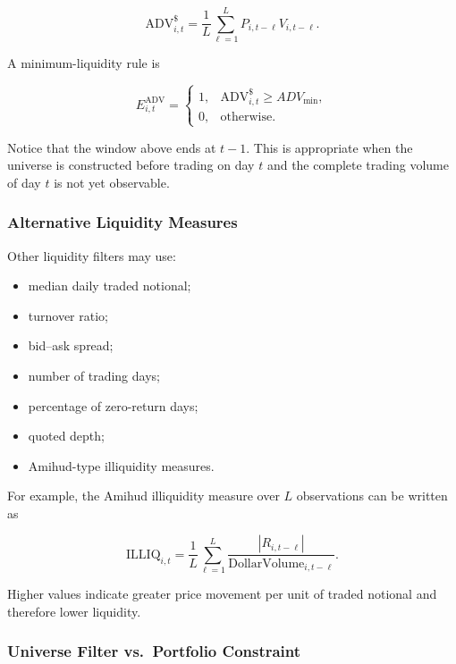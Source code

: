 \documentclass[11pt,a4paper]{article}
\begin{document}
\begin{equation}
\mathrm{ADV}_{i,t}^{\$}
=
\frac{1}{L}
\sum_{\ell=1}^{L}
P_{i,t-\ell}
V_{i,t-\ell}.
\end{equation}

A minimum-liquidity rule is

\begin{equation}
E_{i,t}^{\mathrm{ADV}}
=
\begin{cases}
1,
&
\mathrm{ADV}_{i,t}^{\$}
\geq
ADV_{\min},
\\
0,
&
\text{otherwise}.
\end{cases}
\end{equation}

Notice that the window above ends at $t-1$. This is appropriate when the
universe is constructed before trading on day $t$ and the complete trading
volume of day $t$ is not yet observable.


\subsubsection{Alternative Liquidity Measures}

Other liquidity filters may use:

\begin{itemize}
    \item median daily traded notional;
    \item turnover ratio;
    \item bid--ask spread;
    \item number of trading days;
    \item percentage of zero-return days;
    \item quoted depth;
    \item Amihud-type illiquidity measures.
\end{itemize}

For example, the Amihud illiquidity measure over $L$ observations can be written
as

\begin{equation}
\boxed{
\mathrm{ILLIQ}_{i,t}
=
\frac{1}{L}
\sum_{\ell=1}^{L}
\frac{
|R_{i,t-\ell}|
}{
\mathrm{DollarVolume}_{i,t-\ell}
}.
}
\end{equation}

Higher values indicate greater price movement per unit of traded notional and
therefore lower liquidity.


\subsubsection{Universe Filter vs.\ Portfolio Constraint}
\end{document}
